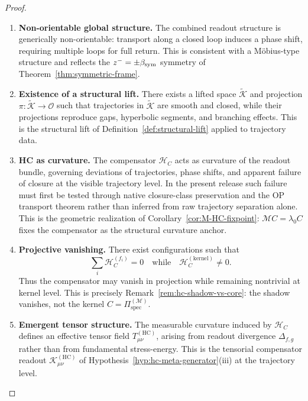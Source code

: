 \begin{proof}
\begin{theorem}
\begin{enumerate}[label=(\arabic*)]
  \item \textbf{Non-orientable global structure.}
  The combined readout structure is generically non-orientable:
  transport along a closed loop induces a phase shift, requiring
  multiple loops for full return. This is consistent with a
  Möbius-type structure and reflects the $z^- = \pm\beta_{\mathrm{sym}}$
  symmetry of Theorem~\ref{thm:symmetric-frame}.

  \item \textbf{Existence of a structural lift.}
  There exists a lifted space $\tilde{\mathcal{K}}$ and projection
  $\pi : \tilde{\mathcal{K}} \to \mathcal{O}$ such that trajectories
  in $\tilde{\mathcal{K}}$ are smooth and closed, while their
  projections reproduce gaps, hyperbolic segments, and branching
  effects. This is the structural lift of
  Definition~\ref{def:structural-lift} applied to trajectory data.

  \item \textbf{HC as curvature.}
  The compensator $\mathcal{H}_C$ acts as curvature of the readout
  bundle, governing deviations of trajectories, phase shifts, and
  apparent failure of closure at the visible trajectory level. In the
  present release such failure must first be tested through native
  closure-class preservation and the OP transport theorem rather than
  inferred from raw trajectory separation alone. This is the geometric
  realization of Corollary~\ref{cor:M-HC-fixpoint}: $\mathcal{M}C = \lambda_0 C$
  fixes the compensator as the structural curvature anchor.

  \item \textbf{Projective vanishing.}
  There exist configurations such that
  \[
    \sum_i \mathcal{H}_C^{(f_i)} = 0
    \quad\text{while}\quad
    \mathcal{H}_C^{(\mathrm{kernel})} \neq 0.
  \]
  Thus the compensator may vanish in projection while remaining
  nontrivial at kernel level. This is precisely
  Remark~\ref{rem:hc-shadow-vs-core}: the shadow vanishes, not
  the kernel $C = \Pi^{(\mathcal{M})}_{\mathrm{spec}}$.

  \item \textbf{Emergent tensor structure.}
  The measurable curvature induced by $\mathcal{H}_C$ defines an
  effective tensor field $T_{\mu\nu}^{(\mathrm{HC})}$, arising from
  readout divergence $\Delta_{f,g}$ rather than from fundamental
  stress-energy. This is the tensorial compensator readout
  $\mathcal{K}_{\mu\nu}^{(\mathrm{HC})}$ of
  Hypothesis~\ref{hyp:hc-meta-generator}(iii) at the trajectory level.


\end{enumerate}
\end{theorem}
\end{proof}
